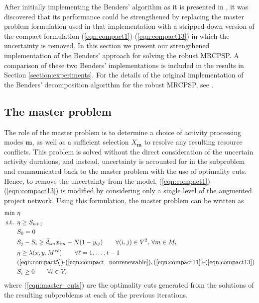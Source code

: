 \documentclass[a4paper,abstracton]{scrartcl}
\begin{document}
After initially implementing the Benders' algorithm as it is presented in \cite{balouka2021robust}, it was discovered that its performance could be strengthened by replacing the master problem formulation used in that implementation with a stripped-down version of the compact formulation (\ref{eqn:compact1})-(\ref{eqn:compact13}) in which the uncertainty is removed. In this section we present our strengthened implementation of the Benders' approach for solving the robust MRCPSP. A comparison of these two Benders' implementations is included in the results in Section \ref{section:experiments}. For the details of the original implementation of the Benders' decomposition algorithm for the robust MRCPSP, see \cite{balouka2021robust}.

\subsection{The master problem}

The role of the master problem is to determine a choice of activity processing modes $\bm{m}$, as well as a sufficient selection $X_{\bm{m}}$ to resolve any resulting resource conflicts. This problem is solved without the direct consideration of the uncertain activity durations, and instead, uncertainty is accounted for in the subproblem and communicated back to the master problem with the use of optimality cuts. Hence, to remove the uncertainty from the model, (\ref{eqn:compact1})-(\ref{eqn:compact13}) is modified by considering only a single level of the augmented project network. Using this formulation, the master problem can be written as
\begin{align}
\min \ & \eta\label{eqn:master_first}\\
\text{s.t. } & \eta \geq S_{n+1}\\
	     & S_{0}=0\label{eqn:master2}\\
	     & S_{j} - S_{i} \geq \bar{d}_{im}x_{im} - N(1-y_{ij}) \qquad \forall (i,j)\in V^2,\,\forall m\in M_i\label{eqn:master3}\\
	     & \eta \geq \lambda(x, y, M^{*\ell}) \qquad \forall \ell=1,\dots,t-1\label{eqn:master_cuts}\\
	     & \textnormal{(\ref{eqn:compact5})-(\ref{eqn:compact_nonrenewable}),\,(\ref{eqn:compact11})-(\ref{eqn:compact13})}\\
	     & S_i\geq 0 \qquad \forall i\in V,\label{eqn:master_last}
\end{align}
where (\ref{eqn:master_cuts}) are the optimality cuts generated from the solutions of the resulting subproblems at each of the previous iterations.
\end{document}
